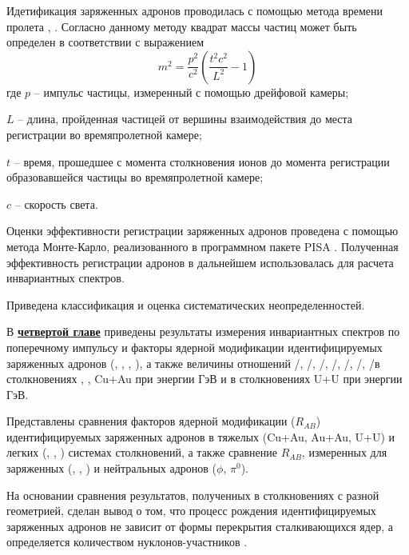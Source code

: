 Идетификация заряженных адронов проводилась с помощью метода времени пролета \autocite{nucleus2020}, \cite{PPG026, ppg146}. Согласно данному методу  квадрат массы частиц может быть определен в соответствии с выражением 
$$m^2 = \frac{p^2}{c^2} \left(  \frac{t^2 c^2}{L^2} - 1\right)$$
где $p$ -- импульс частицы, измеренный с помощью дрейфовой камеры; 

$L$ -- длина, пройденная частицей от вершины взаимодействия до места регистрации во времяпролетной камере; 

$t$ -- время, прошедшее с момента столкновения ионов до момента регистрации образовавшейся частицы во времяпролетной камере; 

$c$ -- скорость света.

Оценки эффективности регистрации заряженных адронов проведена с помощью метода Монте-Карло, реализованного в программном пакете PISA \cite{PISA}. Полученная эффективность регистрации адронов в дальнейшем использовалась для расчета инвариантных спектров. 

Приведена классификация и оценка систематических неопределенностей. %

\begin{comment}
Формулы в строку без номера добавляются так:
\[
    \lambda_{T_s} = K_x\frac{d{x}}{d{T_s}}, \qquad
    \lambda_{q_s} = K_x\frac{d{x}}{d{q_s}},
\]
\end{comment}

В \underline{\textbf{четвертой главе}} приведены результаты измерения инвариантных спектров по поперечному импульсу и факторы ядерной модификации идентифицируемых заряженных адронов (\pipm, \Kpm, \prot, \aprot), а также величины отношений \pim/\pip, \Km/\Kp, \prot/\aprot, \prot/\pip, \aprot/\pim, \Kp/\pip, \Km/\pim в столкновениях  \pal, \heau, Cu+Au при энергии  ГэВ и в столкновениях U+U при энергии  ГэВ. 

Представлены сравнения факторов ядерной модификации ($R_{AB}$) идентифицируемых заряженных адронов в тяжелых (Cu+Au, Au+Au, U+U) и легких (\pal, \dau, \heau) системах столкновений, а также сравнение $R_{AB}$, измеренных для заряженных (\pipm, \Kpm, \prots) и нейтральных адронов ($\phi$, $\pi^{0}$).

На основании сравнения результатов, полученных в столкновениях с разной геометрией, сделан вывод о том, что процесс рождения идентифицируемых заряженных адронов не зависит от формы перекрытия сталкивающихся ядер, а определяется количеством нуклонов-участников \Npart.


